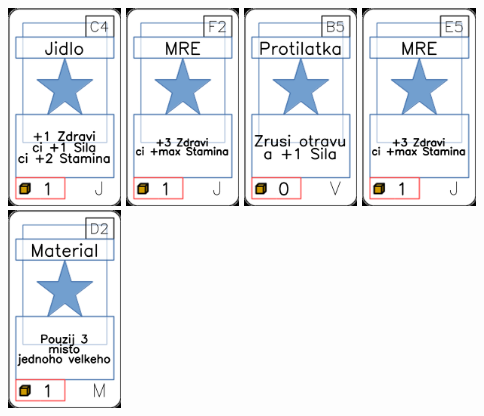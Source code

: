 \documentclass[a4paper]{article}
\begin{document}
	\includegraphics[width=3.0cm]{img-1_13}
	\includegraphics[width=3.0cm]{img-1_26}
	\includegraphics[width=3.0cm]{img-1_69}
	\includegraphics[width=3.0cm]{img-1_24}
	\includegraphics[width=3.0cm]{img-1_46}
\end{document}
